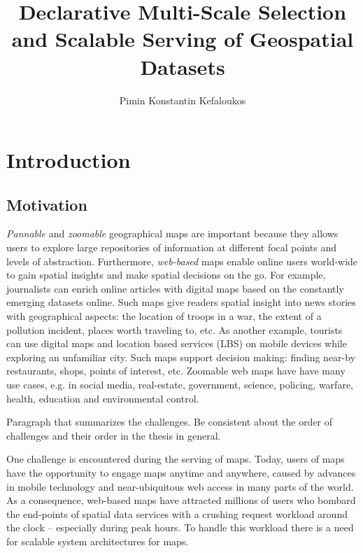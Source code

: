 \documentclass[11pt, oneside]{report}   	%
\title{Declarative Multi-Scale Selection and Scalable Serving of Geospatial Datasets}
\author{Pimin Konstantin Kefaloukos}
\begin{document}
\maketitle

\tableofcontents

\chapter{Introduction}


\section{Motivation}
\emph{Pannable} and \emph{zoomable} geographical maps are important because they allows users to explore large repositories of information at different focal points and levels of abstraction. Furthermore, \emph{web-based} maps enable online users world-wide to gain spatial insights and make spatial decisions on the go. For example, journalists can enrich online articles with digital maps based on the constantly emerging datasets online. Such maps give readers spatial insight into news stories with geographical aspects: the location of troops in a war, the extent of a pollution incident, places worth traveling to, etc. As another example, tourists can use digital maps and location based services (LBS) on mobile devices while exploring an unfamiliar city. Such maps support decision making: finding near-by restaurants, shops, points of interest, etc. Zoomable web maps have have many use cases, e.g. in social media, real-estate, government, science, policing, warfare, health, education and environmental control.%

Paragraph that summarizes the challenges. Be consistent about the order of challenges and their order in the thesis in general.

One challenge is encountered during the serving of maps. Today, users of maps have the opportunity to engage maps anytime and anywhere, caused by advances in mobile technology and near-ubiquitous web access in many parts of the world. As a consequence, web-based maps have attracted millions of users who bombard the end-points of spatial data services with a crushing request workload around the clock -- especially during peak hours. To handle this workload there is a need for scalable system architectures for maps. %
\end{document}

